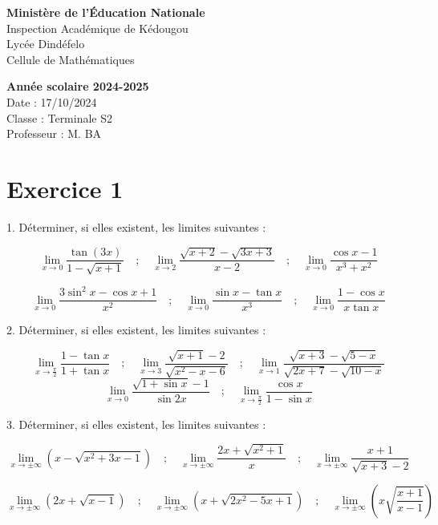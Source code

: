 \documentclass[12pt]{article}
\begin{document}
\noindent
\begin{minipage}[t]{0.48\textwidth}
\raggedright
\textbf{Ministère de l'Éducation Nationale}\\
Inspection Académique de Kédougou\\
Lycée Dindéfelo\\
Cellule de Mathématiques
\end{minipage}
\hfill
\begin{minipage}[t]{0.48\textwidth}
\raggedleft
\textbf{Année scolaire 2024-2025}\\
Date : 17/10/2024\\
Classe : Terminale S2\\
Professeur : M. BA
\end{minipage}

\vspace{1cm}
\section*{Exercice 1}

1. Déterminer, si elles existent, les limites suivantes :

\[
\lim_{x \to 0} \frac{\tan(3x)}{1 - \sqrt{x + 1}} \quad ; \quad \lim_{x \to 2} \frac{\sqrt{x+2} - \sqrt{3x+3}}{x-2} \quad ; \quad \lim_{x \to 0} \frac{\cos x - 1}{x^3 + x^2}
\]

\[
\lim_{x \to 0} \frac{3 \sin^2 x - \cos x + 1}{x^2} \quad ; \quad \lim_{x \to 0} \frac{\sin x - \tan x}{x^3}\quad ; \quad\lim_{x \to 0} \frac{1 - \cos x}{x \tan x}
\]

2. Déterminer, si elles existent, les limites suivantes :

\[
\lim_{x \to \frac{\pi}{2}} \frac{1 - \tan x}{1 + \tan x}\quad ; \quad \lim_{x \to 3} \frac{\sqrt{x+1} - 2}{\sqrt{x^2 - x - 6}}\quad ; \quad\lim_{x \to 1} \frac{\sqrt{x+3} - \sqrt{5-x}}{\sqrt{2x+7} - \sqrt{10-x}}
\]
\[
\lim_{x \to 0} \frac{\sqrt{1+\sin x} -1}{\sin 2x}\quad ; \quad\lim_{x \to \frac{\pi}{2}} \frac{\cos x}{1-\sin x}
\]

3. Déterminer, si elles existent, les limites suivantes :

\[
\lim_{x \to \pm \infty} \left(x - \sqrt{x^2 + 3x - 1}\right)\quad; \quad \lim_{x \to \pm \infty} \frac{2x + \sqrt{x^2 + 1}}{x}\quad; \quad
\lim_{x \to \pm \infty} \frac{x+1}{\sqrt{x+3}-2}
\]

\[
\lim_{x \to \pm \infty} \left(2x + \sqrt{x - 1}\right)\quad; \quad
\lim_{x \to \pm \infty} \left(x + \sqrt{2x^{2} - 5x + 1 }\right)\quad; \quad
\lim_{x \to \pm \infty} \left(x\sqrt{\frac{x+1}{x-1}}\right)
\]
\end{document}

